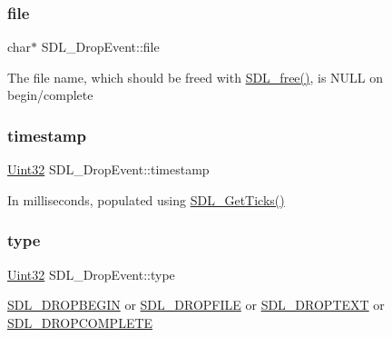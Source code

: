 \subsubsection{\texorpdfstring{file}{file}}
{\footnotesize\ttfamily char$\ast$ S\+D\+L\+\_\+\+Drop\+Event\+::file}

The file name, which should be freed with \hyperlink{_s_d_l__stdinc_8h_a0e4ade894d550ada1fa19dc2d46e88b8}{S\+D\+L\+\_\+free()}, is N\+U\+LL on begin/complete \mbox{\label{struct_s_d_l___drop_event_a02d2c81bb22db632a40cd0021ff751ab}} 
\subsubsection{\texorpdfstring{timestamp}{timestamp}}
{\footnotesize\ttfamily \hyperlink{_s_d_l__stdinc_8h_add440eff171ea5f55cb00c4a9ab8672d}{Uint32} S\+D\+L\+\_\+\+Drop\+Event\+::timestamp}

In milliseconds, populated using \hyperlink{_s_d_l__timer_8h_a0b9bc71d6287e0ffafdc3419760fe2b3}{S\+D\+L\+\_\+\+Get\+Ticks()} \mbox{\label{struct_s_d_l___drop_event_a5ea27cfaa5f8d4940e9a69b68b3cc035}} 
\subsubsection{\texorpdfstring{type}{type}}
{\footnotesize\ttfamily \hyperlink{_s_d_l__stdinc_8h_add440eff171ea5f55cb00c4a9ab8672d}{Uint32} S\+D\+L\+\_\+\+Drop\+Event\+::type}

\hyperlink{_s_d_l__events_8h_a3b589e89be6b35c02e0dd34a55f3fccaa0809886c132aaf734fff6f2abf466912}{S\+D\+L\+\_\+\+D\+R\+O\+P\+B\+E\+G\+IN} or \hyperlink{_s_d_l__events_8h_a3b589e89be6b35c02e0dd34a55f3fccaad9238862d7aeaebff88be6453ee0fbab}{S\+D\+L\+\_\+\+D\+R\+O\+P\+F\+I\+LE} or \hyperlink{_s_d_l__events_8h_a3b589e89be6b35c02e0dd34a55f3fccaa1d97f901333e40b0ccc4dff1a319213f}{S\+D\+L\+\_\+\+D\+R\+O\+P\+T\+E\+XT} or \hyperlink{_s_d_l__events_8h_a3b589e89be6b35c02e0dd34a55f3fccaaa83e80a89d5c4ff14889d07dddc402ef}{S\+D\+L\+\_\+\+D\+R\+O\+P\+C\+O\+M\+P\+L\+E\+TE} \mbox{\label{struct_s_d_l___drop_event_a8cecd2178cdc04118bf852e7cf7bf647}} 
